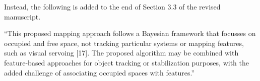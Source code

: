 \documentclass[11pt]{article}
\newenvironment{correction}{\begin{list}{}{\setlength{\leftmargin}{1cm}\setlength{\rightmargin}{1cm}}\vspace{\parsep}\item[]``}{''\end{list}}
\begin{document}
\begin{enumerate}
Instead, the following is added to the end of Section 3.3 of the revised manuscript. 

\begin{correction}This proposed mapping approach follows a Bayesian framework that focusses on occupied and free space, not tracking particular systems or mapping features, such as visual servoing [17]. The proposed algorithm may be combined with feature-based approaches for object tracking or stabilization purposes, with the added challenge of associating occupied spaces with features.\end{correction}


%
%


\end{enumerate}
\end{document}
